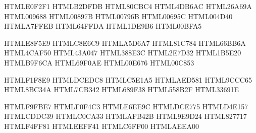 \definecolor{Teal-50}         {HTML}{E0F2F1}
\definecolor{Teal-100}        {HTML}{B2DFDB}
\definecolor{Teal-200}        {HTML}{80CBC4}
\definecolor{Teal-300}        {HTML}{4DB6AC}
\definecolor{Teal-400}        {HTML}{26A69A}
\definecolor{Teal-500}        {HTML}{009688}
\definecolor{Teal-600}        {HTML}{00897B}
\definecolor{Teal-700}        {HTML}{00796B}
\definecolor{Teal-800}        {HTML}{00695C}
\definecolor{Teal-900}        {HTML}{004D40}
\definecolor{Teal-A100}       {HTML}{A7FFEB}
\definecolor{Teal-A200}       {HTML}{64FFDA}
\definecolor{Teal-A400}       {HTML}{1DE9B6}
\definecolor{Teal-A700}       {HTML}{00BFA5}

\definecolor{Green-50}        {HTML}{E8F5E9}
\definecolor{Green-100}       {HTML}{C8E6C9}
\definecolor{Green-200}       {HTML}{A5D6A7}
\definecolor{Green-300}       {HTML}{81C784}
\definecolor{Green-400}       {HTML}{66BB6A}
\definecolor{Green-500}       {HTML}{4CAF50}
\definecolor{Green-600}       {HTML}{43A047}
\definecolor{Green-700}       {HTML}{388E3C}
\definecolor{Green-800}       {HTML}{2E7D32}
\definecolor{Green-900}       {HTML}{1B5E20}
\definecolor{Green-A100}      {HTML}{B9F6CA}
\definecolor{Green-A200}      {HTML}{69F0AE}
\definecolor{Green-A400}      {HTML}{00E676}
\definecolor{Green-A700}      {HTML}{00C853}

\definecolor{Light-Green-50}  {HTML}{F1F8E9}
\definecolor{Light-Green-100} {HTML}{DCEDC8}
\definecolor{Light-Green-200} {HTML}{C5E1A5}
\definecolor{Light-Green-300} {HTML}{AED581}
\definecolor{Light-Green-400} {HTML}{9CCC65}
\definecolor{Light-Green-500} {HTML}{8BC34A}
\definecolor{Light-Green-600} {HTML}{7CB342}
\definecolor{Light-Green-700} {HTML}{689F38}
\definecolor{Light-Green-800} {HTML}{558B2F}
\definecolor{Light-Green-900} {HTML}{33691E}

\definecolor{Lime-50}         {HTML}{F9FBE7}
\definecolor{Lime-100}        {HTML}{F0F4C3}
\definecolor{Lime-200}        {HTML}{E6EE9C}
\definecolor{Lime-300}        {HTML}{DCE775}
\definecolor{Lime-400}        {HTML}{D4E157}
\definecolor{Lime-500}        {HTML}{CDDC39}
\definecolor{Lime-600}        {HTML}{C0CA33}
\definecolor{Lime-700}        {HTML}{AFB42B}
\definecolor{Lime-800}        {HTML}{9E9D24}
\definecolor{Lime-900}        {HTML}{827717}
\definecolor{Lime-A100}       {HTML}{F4FF81}
\definecolor{Lime-A200}       {HTML}{EEFF41}
\definecolor{Lime-A400}       {HTML}{C6FF00}
\definecolor{Lime-A700}       {HTML}{AEEA00}

